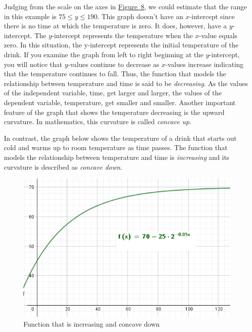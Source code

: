 \documentclass[10pt,]{book}
\theoremstyle{ptxdefinitionnotitle}
\theoremstyle{ptxdefinitiontitle}
\numberwithin{equation}{section}
\begin{document}
\begin{example}
\par
\hypertarget{p-26}{}%
Judging from the scale on the axes in \hyperref[chapter02-section01-example02-graph]{Figure~8}, we could estimate that the range in this example is \(75 \leq y \leq 190\). This graph doesn’t have an \(x\)-intercept since there is no time at which the temperature is zero.  It does, however, have a \(y\)-intercept.  The \(y\)-intercept represents the temperature when the \(x\)-value equals zero.  In this situation, the y-intercept represents the initial temperature of the drink.  If you examine the graph from left to right beginning at the \(y\)-intercept, you will notice that \(y\)-values continue to decrease as \(x\)-values increase indicating that the temperature continues to fall.   Thus, the function that models the relationship between temperature and time is said to be \emph{decreasing}.  As the values of the independent variable, time, get larger and larger, the values of the dependent variable, temperature, get smaller and smaller.  Another important feature of the graph that shows the temperature decreasing is the upward curvature.  In mathematics, this curvature is called \emph{concave up}.%
\par
\hypertarget{p-27}{}%
In contrast, the graph below shows the temperature of a drink that starts out cold and warms up to room temperature as time passes. The function that models the relationship between temperature and time is \emph{increasing} and its curvature is described as \emph{concave down}.%
\begin{figure}
\centering
\includegraphics[width=1\linewidth]{./src/images/chapter02/chapter02section01-example02-graph2.png}
\caption{Function that is increasing and concave down\label{chapter02-section01-example02-graph2}}
\end{figure}
\end{example}
\end{document}
